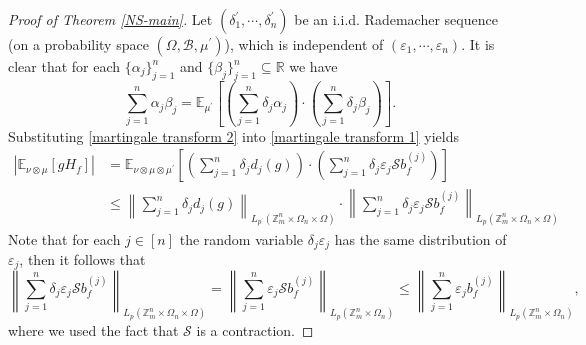 \documentclass{amsart}
\numberwithin{equation}{section}
\newcommand{\Z}{{\mathbb{Z}^{n}_{m}}}
\begin{document}
\begin{proof}[Proof of Theorem \ref{NS-main}]
Let $(\delta^{\prime}_{1},\cdots, \delta^{\prime}_{n})$ be an i.i.d. Rademacher sequence (on a probability space $(\Omega,\mathcal{B},\mu^{\prime})$), which is independent of $(\varepsilon_{1},\cdots,\varepsilon_{n})$. It is clear that for each $\{\alpha_{j}\}_{j=1}^{n}$ and $\{\beta_{j}\}_{j=1}^{n}\subseteq \mathbb{R}$ we have
\begin{equation}\label{martingale transform 2}
\sum_{j=1}^{n}\alpha_{j}\beta_{j}=\mathbb{E}_{\mu^{\prime}}\left[\left(\sum_{j=1}^{n}\delta_{j}\alpha_{j}\right)\cdot\left(\sum_{j=1}^{n}\delta_{j}\beta_{j}\right)\right].
\end{equation}
Substituting \eqref{martingale transform 2} into \eqref{martingale transform 1}  yields
\begin{equation}\label{martingale transform 3}
\begin{split}
|\mathbb{E}_{\nu\otimes \mu}\left[gH_{f}\right]|&=\mathbb{E}_{\nu\otimes \mu\otimes \mu^{\prime}}\left[\left(\sum_{j=1}^{n}\delta_{j}d_{j}(g)\right)\cdot \left(\sum_{j=1}^{n}\delta_{j}\varepsilon_{j} \mathcal{S}b^{(j)}_{f}\right)\right]\\
&\leq \left\|\sum_{j=1}^{n}\delta_{j}d_{j}(g)\right\|_{L_{p^{\prime}}(\Z\times \Omega_{n}\times \Omega)}\cdot\left\|\sum_{j=1}^{n}\delta_{j}\varepsilon_{j} \mathcal{S}b^{(j)}_{f}\right\|_{L_{p}(\Z\times \Omega_{n}\times \Omega)}
\end{split}
\end{equation}
Note that for each $j\in [n]$ the random variable $\delta_{j}\varepsilon_{j}$ has the same distribution of $\varepsilon_{j}$, then it follows that
\begin{equation}\label{martingale transform 4}
\left\|\sum_{j=1}^{n}\delta_{j}\varepsilon_{j} \mathcal{S}b^{(j)}_{f}\right\|_{L_{p}(\Z\times \Omega_{n}\times \Omega)}=\left\|\sum_{j=1}^{n}\varepsilon_{j}\mathcal{S}b^{(j)}_{f}\right\|_{L_{p}(\Z\times \Omega_{n})}\leq \left\|\sum_{j=1}^{n}\varepsilon_{j}b^{(j)}_{f}\right\|_{L_{p}(\Z\times \Omega_{n})},
\end{equation}
where we used the fact that $\mathcal{S}$ is a contraction.


\end{proof}
\end{document}
